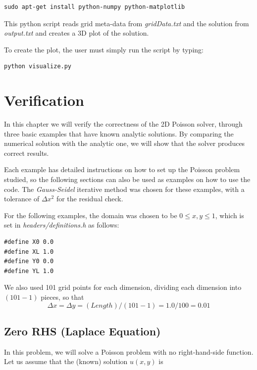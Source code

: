\documentclass[11pt]{report}
\begin{document}
\begin{lstlisting}
sudo apt-get install python-numpy python-matplotlib
\end{lstlisting}

This python script reads grid meta-data from \emph{gridData.txt} and the solution from \emph{output.txt} and creates a 3D plot of the solution.

To create the plot, the user must simply run the script by typing:

\begin{lstlisting}
python visualize.py
\end{lstlisting}

\chapter{Verification}
In this chapter we will verify the correctness of the 2D Poisson solver, through three basic examples that have known analytic solutions. By comparing the numerical solution with the analytic one, we will show that the solver produces correct results.
\newline

Each example has detailed instructions on how to set up the Poisson problem studied, so the following sections can also be used as examples on how to use the code. The \emph{Gauss-Seidel} iterative method was chosen for these examples, with a tolerance of $\Delta x^2$ for the residual check.
\newline

For the following examples, the domain was chosen to be $0 \leq x,y \leq 1$, which is set in \emph{headers/definitions.h} as follows:

\begin{lstlisting}
#define X0 0.0
#define XL 1.0
#define Y0 0.0
#define YL 1.0
\end{lstlisting}

We also used 101 grid points for each dimension, dividing each dimension into $(101 - 1)$ pieces, so that 
\begin{equation}
\Delta x = \Delta y = (Length) / (101 - 1) = 1.0 / 100 = 0.01
\end{equation}
\newpage

\section{Zero RHS (Laplace Equation)}
In this problem, we will solve a Poisson problem with no right-hand-side function. Let us assume that the (known) solution $u(x,y)$ is 
\end{document}

